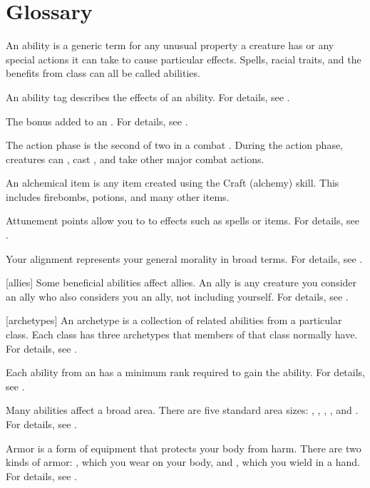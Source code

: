 \chapter{Glossary}\label{Glossary}

 An ability is a generic term for any unusual property a creature has or any special actions it can take to cause particular effects.
Spells, racial traits, and the benefits from class  can all be called abilities.

 An ability tag describes the effects of an ability.
For details, see .

 The bonus added to an .
For details, see .

 The action phase is the second of two  in a combat .
During the action phase, creatures can , cast , and take other major combat actions.

 An alchemical item is any item created using the Craft (alchemy) skill.
This includes firebombs, potions, and many other items.

 Attunement points allow you to  to effects such as spells or items.
For details, see .

 Your alignment represents your general morality in broad terms.
For details, see .

[allies] Some beneficial abilities affect allies.
An ally is any creature you consider an ally who also considers you an ally, not including yourself.
For details, see .

[archetypes] An archetype is a collection of related abilities from a particular class.
Each class has three archetypes that members of that class normally have.
For details, see .

 Each ability from an  has a minimum rank required to gain the ability.
For details, see .

 Many abilities affect a broad area.
There are five standard area sizes: \smallarea, \medarea, \largearea, \hugearea, and \gargarea.
For details, see .

 Armor is a form of equipment that protects your body from harm.
There are two kinds of armor: , which you wear on your body, and , which you wield in a hand.
For details, see .

